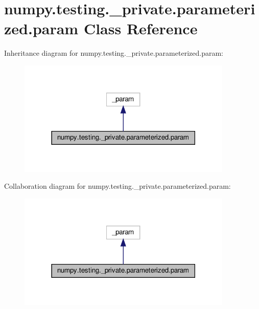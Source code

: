 \hypertarget{classnumpy_1_1testing_1_1__private_1_1parameterized_1_1param}{}\section{numpy.\+testing.\+\_\+private.\+parameterized.\+param Class Reference}
\label{classnumpy_1_1testing_1_1__private_1_1parameterized_1_1param}


Inheritance diagram for numpy.\+testing.\+\_\+private.\+parameterized.\+param\+:
\nopagebreak
\begin{figure}[H]
\begin{center}
\leavevmode
\includegraphics[width=290pt]{classnumpy_1_1testing_1_1__private_1_1parameterized_1_1param__inherit__graph}
\end{center}
\end{figure}


Collaboration diagram for numpy.\+testing.\+\_\+private.\+parameterized.\+param\+:
\nopagebreak
\begin{figure}[H]
\begin{center}
\leavevmode
\includegraphics[width=290pt]{classnumpy_1_1testing_1_1__private_1_1parameterized_1_1param__coll__graph}
\end{center}
\end{figure}
